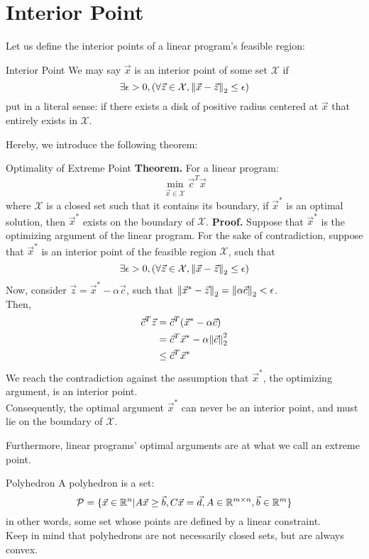 \section{Interior Point}
Let us define the interior points of a linear program's feasible region:
\begin{ln-define}{Interior Point}{}
    We may say $\vec{x}$ is an interior point of some set $\mathcal{X}$ if
    \[
        \exists \epsilon > 0, (\forall \vec{z} \in \mathcal{X}, \pnorm{\vec{x} - \vec{z}}{2} \leq \epsilon)
    \]
    put in a literal sense: if there exists a disk of positive radius centered at $\vec{x}$ that entirely exists in $\mathcal{X}$.
\end{ln-define}
Hereby, we introduce the following theorem:
\begin{ln-theorem}{Optimality of Extreme Point}{}
    \textbf{Theorem.} For a linear program:
    \[
        \min_{\vec{x} \in \mathcal{X}} \vec{c}^T \vec{x}
    \]
    where $\mathcal{X}$ is a closed set such that it contains its boundary, if $\vec{x}^*$ is an optimal solution, then $\vec{x}^*$ exists on the boundary of $\mathcal{X}$.
    \tcblower
    \textbf{Proof.} Suppose that $\vec{x}^*$ is the optimizing argument of the linear program.
    For the sake of contradiction, suppose that $\vec{x}^*$ is an interior point of the feasible region $\mathcal{X}$, such that
    \[
        \exists \epsilon > 0, (\forall \vec{z} \in \mathcal{X}, \pnorm{\vec{x} - \vec{z}}{2} \leq \epsilon)
    \]
    Now, consider $\vec{z} = \vec{x}^* - \alpha \vec{c}$, such that $\pnorm{\vec{x}^* - \vec{z}}{2} = \pnorm{\alpha \vec{c}}{2} < \epsilon$. \\
    Then,
    \begin{align*}
        \vec{c}^T \vec{z}
        &= \vec{c}^T (\vec{x}^* - \alpha \vec{c}) \\
        &= \vec{c}^T \vec{x}^* - \alpha \pnorm[2]{\vec{c}}{2} \\
        &\leq \vec{c}^T \vec{x}^*
    \end{align*}
    We reach the contradiction against the assumption that $\vec{x}^*$, the optimizing argument, is an interior point. \\
    Consequently, the optimal argument $\vec{x}^*$ can never be an interior point, and must lie on the boundary of $\mathcal{X}$.
\end{ln-theorem}
Furthermore, linear programs' optimal arguments are at what we call an extreme point.
\begin{ln-define}{Polyhedron}{}
    A polyhedron is a set:
    \[
        \mathcal{P} = 
        \{
            \vec{x} \in \R^n | A \vec{x} \geq \vec{b}, C \vec{x} = \vec{d}, A \in \R^{m \times n}, \vec{b} \in \R^m
        \}
    \]
    in other words, some set whose points are defined by a linear constraint. \\
    Keep in mind that polyhedrons are not necessarily closed sets, but are always convex.
\end{ln-define}

